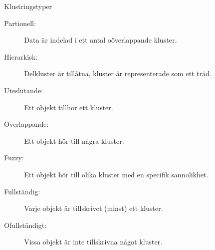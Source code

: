 \documentclass[10pt,english]{beamer}
\begin{document}
\begin{frame}{Klustringstyper}

    \begin{description}
        \item[Partionell:] Data är indelad i ett antal oöverlappande kluster.
        \item[Hierarkisk:] Delkluster är tillåtna, kluster är representerade som ett träd.  
    \end{description}
    \vspace{1cm}
    \begin{description}
        \item[Uteslutande:] Ett objekt tillhör ett kluster.
        \item[Överlappande:] Ett objekt hör till några kluster.
        \item[Fuzzy:] Ett objekt hör till olika kluster med en specifik sannolikhet.  
    \end{description}
    \vspace{1cm}

    \begin{description}
        \item[Fullständig:] Varje objekt är tillskrivet (minst) ett kluster.
        \item[Ofullständigt:] Vissa objekt är inte tillskrivna något kluster. 
    \end{description}
    
\end{frame}
\end{document}
